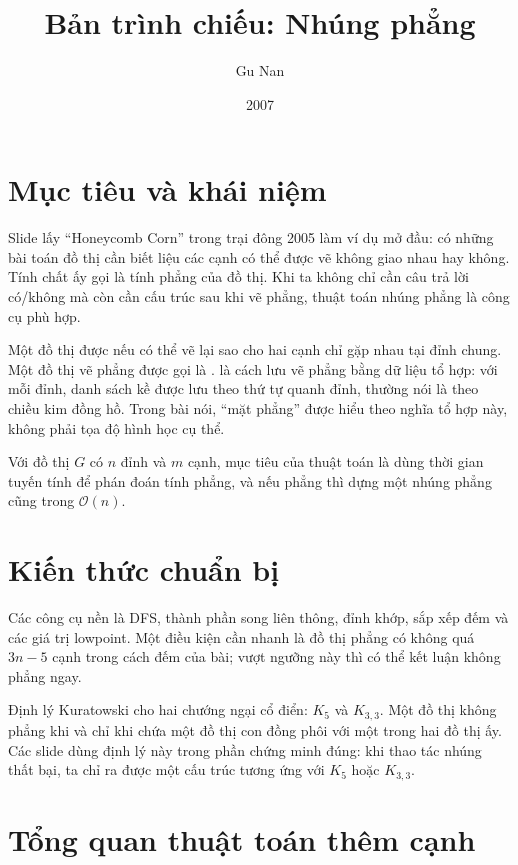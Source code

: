 \documentclass[11pt]{article}
\title{Bản trình chiếu: Nhúng phẳng}
\author{Gu Nan}
\date{2007}
\newcommand{\Oh}{\mathcal{O}}
\newcommand{\Kfive}{K_5}
\newcommand{\Kthree}{K_{3,3}}
\begin{document}
\maketitle


\section{Mục tiêu và khái niệm}

Slide lấy ``Honeycomb Corn'' trong trại đông 2005 làm ví dụ mở đầu: có những
bài toán đồ thị cần biết liệu các cạnh có thể được vẽ không giao nhau hay
không. Tính chất ấy gọi là tính phẳng của đồ thị. Khi ta không chỉ cần câu
trả lời có/không mà còn cần cấu trúc sau khi vẽ phẳng, thuật toán nhúng
phẳng là công cụ phù hợp.

Một đồ thị  được nếu có thể vẽ lại sao cho hai cạnh chỉ gặp
nhau tại đỉnh chung. Một đồ thị vẽ phẳng được gọi là .
 là cách lưu vẽ phẳng bằng dữ liệu tổ hợp: với mỗi đỉnh,
danh sách kề được lưu theo thứ tự quanh đỉnh, thường nói là theo chiều kim
đồng hồ. Trong bài nói, ``mặt phẳng'' được hiểu theo nghĩa tổ hợp này, không
phải tọa độ hình học cụ thể.

Với đồ thị \(G\) có \(n\) đỉnh và \(m\) cạnh, mục tiêu của thuật toán là dùng
thời gian tuyến tính để phán đoán tính phẳng, và nếu phẳng thì dựng một nhúng
phẳng cũng trong \(\Oh(n)\).

\section{Kiến thức chuẩn bị}

Các công cụ nền là DFS, thành phần song liên thông, đỉnh khớp, sắp xếp đếm
và các giá trị lowpoint. Một điều kiện cần nhanh là đồ thị phẳng có không quá
\(3n-5\) cạnh trong cách đếm của bài; vượt ngưỡng này thì có thể kết luận
không phẳng ngay.

Định lý Kuratowski cho hai chướng ngại cổ điển: \(\Kfive\) và \(\Kthree\).
Một đồ thị không phẳng khi và chỉ khi chứa một đồ thị con đồng phôi với một
trong hai đồ thị ấy. Các slide dùng định lý này trong phần chứng minh đúng:
khi thao tác nhúng thất bại, ta chỉ ra được một cấu trúc tương ứng với
\(\Kfive\) hoặc \(\Kthree\).

\section{Tổng quan thuật toán thêm cạnh}
\end{document}
